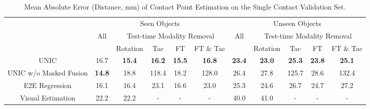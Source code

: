\documentclass[letterpaper, 10 pt, conference]{ieeeconf}  %
\newcommand{\unic}{\textsc{UNIC}}
\begin{document}
\begin{table}[ttt]
\centering
\caption{Mean Absolute Error (Distance, mm) of Contact Point Estimation on the Single Contact Validation Set. }
\label{tab:single_contact}
\begin{tabular}{|c|ccccc|ccccc|}
\hline
\multirow{3}{*}{} & \multicolumn{5}{c|}{Seen Objects}                                                                                                                               & \multicolumn{5}{c|}{Unseen Objects}                                                \\ \cline{2-11} 
                  & \multicolumn{1}{c|}{\multirow{2}{*}{All}} & \multicolumn{4}{c|}{Test-time Modality Removal}                                                                                              & \multicolumn{1}{c|}{\multirow{2}{*}{All}} & \multicolumn{4}{c|}{Test-time Modality Removal}                 \\ \cline{3-6} \cline{8-11} 
                  & \multicolumn{1}{c|}{}                      & \multicolumn{1}{c|}{Rotation} & \multicolumn{1}{c|}{Tac} & \multicolumn{1}{c|}{FT} & FT \& Tac & \multicolumn{1}{c|}{}                    & Rotation   & Tac   & FT   & FT \& Tac \\ \hline
\unic{}              & \multicolumn{1}{c|}{16.7}                  & \textbf{15.4}           & \textbf{16.2}            & \textbf{15.5}           & \textbf{16.8} & \multicolumn{1}{c|}{\textbf{23.4}}            & \textbf{23.0} & \textbf{25.3} & \textbf{23.8} & \textbf{25.1} \\
\unic{} w/o Masked Fusion  & \multicolumn{1}{c|}{\textbf{14.8}}         & 18.8                    & 118.4                    & 18.2                    & 128.0     & \multicolumn{1}{c|}{26.4}                & 27.8 & 125.7 & 28.6 & 132.4     \\
E2E Regression    & \multicolumn{1}{c|}{16.1}                  & 16.4                    & 23.1                     & 16.6                    & 23.0      & \multicolumn{1}{c|}{{25.3}}       & 24.6 & 26.7 & 24.7 & 27.2 \\
Visual Estimation    & \multicolumn{1}{c|}{22.2}                  & 22.2                    & -                    & -                  & -      & \multicolumn{1}{c|}{{40.0}}       & 41.0 & - & - & -\\\hline
\end{tabular}
\end{table}
\end{document}
